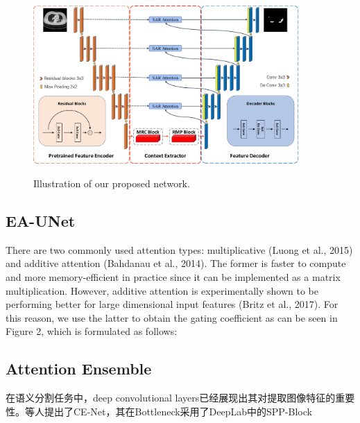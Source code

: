 \documentclass{ieeeaccess}
\begin{document}
\begin{figure}[htbp]
  \xdef\xfigwd{\textwidth}%
  \centering
  \includegraphics[width=0.9\textwidth]{figure/overview.pdf}
  \label{fig:overview}
  \caption{Illustration of our proposed network.}

\end{figure}

\subsection{EA-UNet}

There are two commonly used attention types: multiplicative (Luong et al., 2015) and additive attention (Bahdanau et al., 2014). The former is faster to compute and more memory-efficient in practice since it can be implemented as a
matrix multiplication. However, additive attention is experimentally shown to be performing better for large dimensional input features (Britz et al., 2017). For this reason, we use the latter to obtain the gating coefficient as can be seen in Figure 2, which is formulated as follows:

\subsection{Attention Ensemble}

在语义分割任务中，deep convolutional layers已经展现出其对提取图像特征的重要性。等人提出了CE-Net\cite{cenet}，其在Bottleneck采用了DeepLab中的SPP-Block
\end{document}
